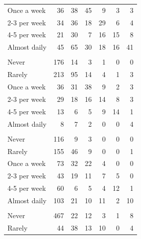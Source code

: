 \documentclass[]{elsarticle} %
\begin{document}
\begin{table}[H]
{\begin{tabular}[t]{lrrrrrr}
\hspace{1em}Once a week & 36 & 38 & 45 & 9 & 3 & 3\\
\hspace{1em}2-3 per week & 34 & 36 & 18 & 29 & 6 & 4\\
\hspace{1em}4-5 per week & 21 & 30 & 7 & 16 & 15 & 8\\
\hspace{1em}Almost daily & 45 & 65 & 30 & 18 & 16 & 41\\
\addlinespace[0.3em]
\multicolumn{7}{l}{\textbf{CNG auto-rickshaw}}\\
\hspace{1em}Never & 176 & 14 & 3 & 1 & 0 & 0\\
\hspace{1em}Rarely & 213 & 95 & 14 & 4 & 1 & 3\\
\hspace{1em}Once a week & 36 & 31 & 38 & 9 & 2 & 3\\
\hspace{1em}2-3 per week & 29 & 18 & 16 & 14 & 8 & 3\\
\hspace{1em}4-5 per week & 13 & 6 & 5 & 9 & 14 & 1\\
\hspace{1em}Almost daily & 8 & 7 & 2 & 0 & 0 & 4\\
\addlinespace[0.3em]
\multicolumn{7}{l}{\textbf{bus}}\\
\hspace{1em}Never & 116 & 9 & 3 & 0 & 0 & 0\\
\hspace{1em}Rarely & 155 & 46 & 9 & 0 & 0 & 1\\
\hspace{1em}Once a week & 73 & 32 & 22 & 4 & 0 & 0\\
\hspace{1em}2-3 per week & 43 & 19 & 11 & 7 & 5 & 0\\
\hspace{1em}4-5 per week & 60 & 6 & 5 & 4 & 12 & 1\\
\hspace{1em}Almost daily & 103 & 21 & 10 & 11 & 2 & 10\\
\addlinespace[0.3em]
\multicolumn{7}{l}{\textbf{motorcycle}}\\
\hspace{1em}Never & 467 & 22 & 12 & 3 & 1 & 8\\
\hspace{1em}Rarely & 44 & 38 & 13 & 10 & 0 & 4\\

\end{tabular}}
\end{table}
\end{document}
